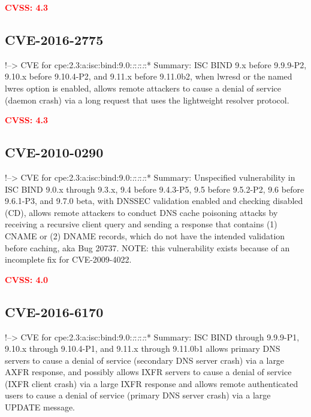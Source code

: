 \documentclass[a4paper, 12pt]{article}
\begin{document}
\textbf{\textcolor{red}{CVSS: 4.3}}

\hypertarget{cve-2016-2775}{%
\subsection{CVE-2016-2775}\label{cve-2016-2775}}

!--\textgreater{} CVE for
cpe:2.3:a:isc:bind:9.0:\emph{:}:\emph{:}:\emph{:}:* Summary: ISC BIND
9.x before 9.9.9-P2, 9.10.x before 9.10.4-P2, and 9.11.x before
9.11.0b2, when lwresd or the named lwres option is enabled, allows
remote attackers to cause a denial of service (daemon crash) via a long
request that uses the lightweight resolver protocol.

\textbf{\textcolor{red}{CVSS: 4.3}}

\hypertarget{cve-2010-0290}{%
\subsection{CVE-2010-0290}\label{cve-2010-0290}}

!--\textgreater{} CVE for
cpe:2.3:a:isc:bind:9.0:\emph{:}:\emph{:}:\emph{:}:* Summary: Unspecified
vulnerability in ISC BIND 9.0.x through 9.3.x, 9.4 before 9.4.3-P5, 9.5
before 9.5.2-P2, 9.6 before 9.6.1-P3, and 9.7.0 beta, with DNSSEC
validation enabled and checking disabled (CD), allows remote attackers
to conduct DNS cache poisoning attacks by receiving a recursive client
query and sending a response that contains (1) CNAME or (2) DNAME
records, which do not have the intended validation before caching, aka
Bug 20737. NOTE: this vulnerability exists because of an incomplete fix
for CVE-2009-4022.

\textbf{\textcolor{red}{CVSS: 4.0}}

\hypertarget{cve-2016-6170}{%
\subsection{CVE-2016-6170}\label{cve-2016-6170}}

!--\textgreater{} CVE for
cpe:2.3:a:isc:bind:9.0:\emph{:}:\emph{:}:\emph{:}:* Summary: ISC BIND
through 9.9.9-P1, 9.10.x through 9.10.4-P1, and 9.11.x through 9.11.0b1
allows primary DNS servers to cause a denial of service (secondary DNS
server crash) via a large AXFR response, and possibly allows IXFR
servers to cause a denial of service (IXFR client crash) via a large
IXFR response and allows remote authenticated users to cause a denial of
service (primary DNS server crash) via a large UPDATE message.
\end{document}
